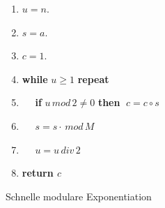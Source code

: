 \documentclass[12pt,oneside]{article}
\theoremstyle{remark}
\theoremstyle{definition}
\begin{document}
\begin{algorithm}[H]
\SetAlgoLined
{}
\begin{enumerate}
    \item $u = n$.
    \item $s = a$.
    \item $c = 1$.
    \item \textbf{while} $u \geq 1$ \textbf{repeat}
    \item $\; \: \: \;$ \textbf{if} $u \, mod \, 2 \neq 0$ \textbf{then}
       $ \; c = c \circ s$
     \item $\; \: \: \;$ $s = s \cdot \, mod \, M$
     \item $\; \: \: \;$ $ u = u \, div \, 2$
     \item \textbf{return $c$}
\end{enumerate}
 \caption{Schnelle modulare Exponentiation}
 \label{appendix:fast_expo}
\end{algorithm}


\end{document}
